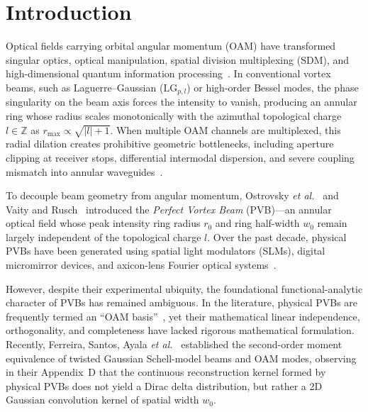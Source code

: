 \documentclass{optica-article}
\begin{document}

\section{Introduction}
\label{sec:intro}

Optical fields carrying orbital angular momentum (OAM) have transformed singular optics, optical manipulation, spatial division multiplexing (SDM), and high-dimensional quantum information processing~\cite{Allen1992,Gbur2016,Mair2001}. In conventional vortex beams, such as Laguerre--Gaussian ($\text{LG}_{p, l}$) or high-order Bessel modes, the phase singularity on the beam axis forces the intensity to vanish, producing an annular ring whose radius scales monotonically with the azimuthal topological charge $l \in \mathbb{Z}$ as $r_{\max} \propto \sqrt{|l| + 1}$. When multiple OAM channels are multiplexed, this radial dilation creates prohibitive geometric bottlenecks, including aperture clipping at receiver stops, differential intermodal dispersion, and severe coupling mismatch into annular waveguides~\cite{Villalba2023}.

To decouple beam geometry from angular momentum, Ostrovsky \emph{et al.}~\cite{Ostrovsky2013} and Vaity and Rusch~\cite{Vaity2015} introduced the \emph{Perfect Vortex Beam} (PVB)---an annular optical field whose peak intensity ring radius $r_0$ and ring half-width $w_0$ remain largely independent of the topological charge $l$. Over the past decade, physical PVBs have been generated using spatial light modulators (SLMs), digital micromirror devices, and axicon-lens Fourier optical systems~\cite{Arrizon2007,Chen2013,Reddy2016}.

However, despite their experimental ubiquity, the foundational functional-analytic character of PVBs has remained ambiguous. In the literature, physical PVBs are frequently termed an ``OAM basis''~\cite{GarciaEscartin2008}, yet their mathematical linear independence, orthogonality, and completeness have lacked rigorous mathematical formulation. Recently, Ferreira, Santos, Ayala \emph{et al.}~\cite{Ferreira2026} established the second-order moment equivalence of twisted Gaussian Schell-model beams and OAM modes, observing in their Appendix~D that the continuous reconstruction kernel formed by physical PVBs does not yield a Dirac delta distribution, but rather a 2D Gaussian convolution kernel of spatial width $w_0$.
\end{document}
